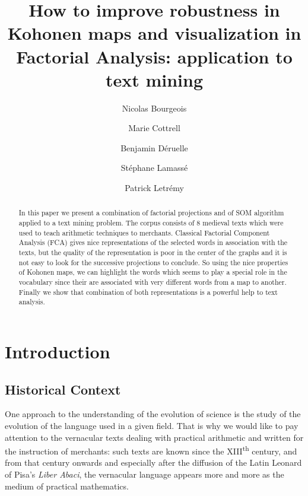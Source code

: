 \documentclass{elsarticle}
\begin{document}
\title{How to improve robustness in Kohonen maps and visualization in Factorial Analysis: application to text mining}

\author[samm]{Nicolas Bourgeois}
\author[samm]{Marie Cottrell}
\author[lamop]{Benjamin D\'eruelle}
\author[lamop]{St\'ephane Lamass\'e}
\author[lamop]{Patrick Letr\'emy}

\address[samm]{SAMM - Universit\'e Paris 1 Panth\'eon-Sorbonne 90, rue de Tolbiac, 75013 Paris, France \mailENS,\mailSAMM}
\address[lamop]{PIREH-LAMOP - Universit\'e Paris 1 Panth\'eon-Sorbonne 1, rue Victor Cousin, Paris, France \mailLAMOP}

\maketitle


\begin{abstract}
In this paper we present a combination of factorial projections and of SOM algorithm applied to a text mining problem. The corpus consists of 8 medieval texts which were used to teach arithmetic techniques to merchants. Classical Factorial Component Analysis (FCA) gives nice representations of the selected words in association with the texts, but the quality of the representation is poor in the center of the graphs and it is not easy to look for the successive projections to conclude. So using the nice properties of Kohonen maps, we can highlight the words which seems to play a special role in the vocabulary since their are associated with very different words from a map to another. Finally we show that combination of both representations is a powerful help to text analysis.
\end{abstract}


\section*{Introduction}
\setcounter{footnote}{0}

\subsection*{Historical Context}

One approach to the understanding of the evolution of science is the study of the evolution of the language used in a given field. That is why we would like to pay attention to the vernacular texts dealing with practical arithmetic and written for the instruction of merchants: such texts are known since the XIII\textsuperscript{th} century, and from that century onwards and especially after the diffusion of the Latin Leonard of Pisa's \textit{Liber Abaci}, the vernacular language appears more and more as the medium of practical mathematics.\\
\end{document}
